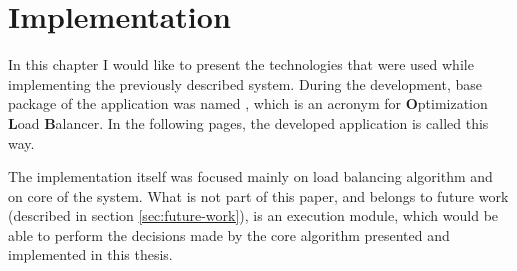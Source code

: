\chapter{Implementation}\label{ch:used-technologies}
In this chapter I would like to present the technologies that were used while implementing the previously described system.
During the development,
base package of the application was named ,
which is an acronym for \textbf{O}ptimization \textbf{L}oad \textbf{B}alancer.
In the following pages, 
the developed application is called this way.

The implementation itself was focused mainly on load balancing algorithm 
and on core of the system.
What is not part of this paper,
and belongs to future work (described in section \ref{sec:future-work}),
is an execution module, 
which would be able to perform the decisions made by the core algorithm presented 
and implemented in this thesis.







